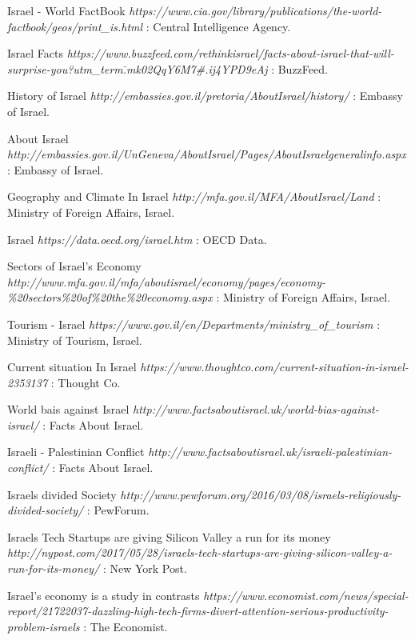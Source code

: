\documentclass[10pt]{article}
\begin{document}
\begin{thebibliography}{1}
 Israel - World FactBook {\em https://www.cia.gov/library/publications/the-world-factbook/geos/print\_is.html} : Central Intelligence Agency.

 Israel Facts {\em https://www.buzzfeed.com/rethinkisrael/facts-about-israel-that-will-surprise-you?utm\_term\=.mk02QqY6M7\#.ij4YPD9eAj} : BuzzFeed.

 History of Israel {\em http://embassies.gov.il/pretoria/AboutIsrael/history/} : Embassy of Israel.

 About Israel {\em http://embassies.gov.il/UnGeneva/AboutIsrael/Pages/AboutIsraelgeneralinfo.aspx} : Embassy of Israel.

 Geography and Climate In Israel {\em http://mfa.gov.il/MFA/AboutIsrael/Land} : Ministry of Foreign Affairs, Israel.

 Israel {\em https://data.oecd.org/israel.htm} : OECD Data.

 Sectors of Israel's Economy {\em http://www.mfa.gov.il/mfa/aboutisrael/economy/pages/economy-\%20sectors\%20of\%20the\%20economy.aspx} : Ministry of Foreign Affairs, Israel.

 Tourism - Israel {\em https://www.gov.il/en/Departments/ministry\_of\_tourism} : Ministry of Tourism, Israel.

 Current situation In Israel {\em https://www.thoughtco.com/current-situation-in-israel-2353137} : Thought Co.

 World bais against Israel {\em http://www.factsaboutisrael.uk/world-bias-against-israel/} : Facts About Israel.

 Israeli - Palestinian Conflict {\em http://www.factsaboutisrael.uk/israeli-palestinian-conflict/} : Facts About Israel.

 Israels divided Society {\em http://www.pewforum.org/2016/03/08/israels-religiously-divided-society/} : PewForum.

 Israels Tech Startups are giving Silicon Valley a run for its money {\em http://nypost.com/2017/05/28/israels-tech-startups-are-giving-silicon-valley-a-run-for-its-money/} : New York Post.

 Israel’s economy is a study in contrasts {\em https://www.economist.com/news/special-report/21722037-dazzling-high-tech-firms-divert-attention-serious-productivity-problem-israels} : The Economist.


\end{thebibliography}
\end{document}
